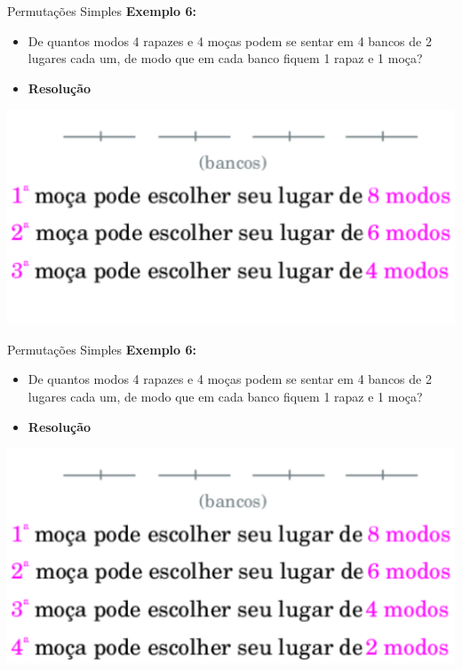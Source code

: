 \documentclass[aspectratio=169]{beamer}
\begin{document}
\begin{frame}{Permutações Simples}
    \textbf{Exemplo 6:}

    \vspace{2mm}

    \begin{itemize}
        \item[] De quantos modos 4 rapazes e 4 moças podem se sentar em 4 bancos de 2 lugares cada um, de modo que em cada banco fiquem 1 rapaz e 1 moça? 
        \item[] \textbf{Resolução}
    \end{itemize}

    \begin{center}
        \includegraphics[width=0.65\linewidth]{figs/Exemplo6_4.png}
    \end{center}
\end{frame}

\begin{frame}{Permutações Simples}
    \textbf{Exemplo 6:}

    \vspace{2mm}

    \begin{itemize}
        \item[] De quantos modos 4 rapazes e 4 moças podem se sentar em 4 bancos de 2 lugares cada um, de modo que em cada banco fiquem 1 rapaz e 1 moça? 
        \item[] \textbf{Resolução}
    \end{itemize}

    \begin{center}
        \includegraphics[width=0.65\linewidth]{figs/Exemplo6_5.png}
    \end{center}
\end{frame}
\end{document}
